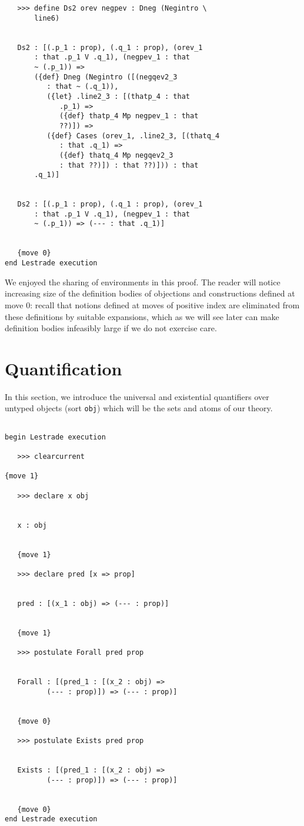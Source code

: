 \documentclass[12pt]{article}
\begin{document}
\begin{verbatim}
   >>> define Ds2 orev negpev : Dneg (Negintro \
       line6)


   Ds2 : [(.p_1 : prop), (.q_1 : prop), (orev_1 
       : that .p_1 V .q_1), (negpev_1 : that 
       ~ (.p_1)) => 
       ({def} Dneg (Negintro ([(negqev2_3 
          : that ~ (.q_1)), 
          ({let} .line2_3 : [(thatp_4 : that 
             .p_1) => 
             ({def} thatp_4 Mp negpev_1 : that 
             ??)]) => 
          ({def} Cases (orev_1, .line2_3, [(thatq_4 
             : that .q_1) => 
             ({def} thatq_4 Mp negqev2_3 
             : that ??)]) : that ??)])) : that 
       .q_1)]


   Ds2 : [(.p_1 : prop), (.q_1 : prop), (orev_1 
       : that .p_1 V .q_1), (negpev_1 : that 
       ~ (.p_1)) => (--- : that .q_1)]


   {move 0}
end Lestrade execution
\end{verbatim}

We enjoyed the sharing of environments in this proof.  The reader will notice increasing size of the definition bodies of objections and constructions defined at move 0:  recall that notions defined at moves of positive index are eliminated from these definitions by suitable expansions, which as we will see later can make definition bodies infeasibly large if we do not exercise care.


\section{Quantification}

In this section, we introduce the universal and existential quantifiers over untyped objects (sort {\tt obj}) which will be the sets and atoms of our theory.

\begin{verbatim}

begin Lestrade execution

   >>> clearcurrent

{move 1}

   >>> declare x obj


   x : obj


   {move 1}

   >>> declare pred [x => prop]


   pred : [(x_1 : obj) => (--- : prop)]


   {move 1}

   >>> postulate Forall pred prop


   Forall : [(pred_1 : [(x_2 : obj) => 
          (--- : prop)]) => (--- : prop)]


   {move 0}

   >>> postulate Exists pred prop


   Exists : [(pred_1 : [(x_2 : obj) => 
          (--- : prop)]) => (--- : prop)]


   {move 0}
end Lestrade execution
\end{verbatim}
\end{document}
